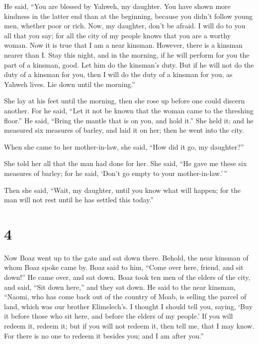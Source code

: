  He said, ``You are blessed by Yahweh, my daughter. You
have shown more kindness in the latter end than at the beginning,
because you didn't follow young men, whether poor or rich.
 Now, my daughter, don't be afraid. I will do to you all
that you say; for all the city of my people knows that you are a worthy
woman.  Now it is true that I am a near kinsman. However,
there is a kinsman nearer than I.  Stay this night, and
in the morning, if he will perform for you the part of a kinsman, good.
Let him do the kinsman's duty. But if he will not do the duty of a
kinsman for you, then I will do the duty of a kinsman for you, as Yahweh
lives. Lie down until the morning.''

 She lay at his feet until the morning, then she rose up
before one could discern another. For he said, ``Let it not be known
that the woman came to the threshing floor.''  He said,
``Bring the mantle that is on you, and hold it.'' She held it; and he
measured six measures of barley, and laid it on her; then he went into
the city.

 When she came to her mother-in-law, she said, ``How did
it go, my daughter?''

She told her all that the man had done for her.  She
said, ``He gave me these six measures of barley; for he said, `Don't go
empty to your mother-in-law.'\,''

 Then she said, ``Wait, my daughter, until you know what
will happen; for the man will not rest until he has settled this
today.''

\hypertarget{section-3}{%
\section{4}\label{section-3}}

 Now Boaz went up to the gate and sat down there. Behold,
the near kinsman of whom Boaz spoke came by. Boaz said to him, ``Come
over here, friend, and sit down!'' He came over, and sat down.
 Boaz took ten men of the elders of the city, and said,
``Sit down here,'' and they sat down.  He said to the near
kinsman, ``Naomi, who has come back out of the country of Moab, is
selling the parcel of land, which was our brother Elimelech's.
 I thought I should tell you, saying, `Buy it before those
who sit here, and before the elders of my people.' If you will redeem
it, redeem it; but if you will not redeem it, then tell me, that I may
know. For there is no one to redeem it besides you; and I am after
you.''

